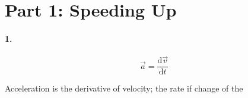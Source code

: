

\usepackage{enumitem}
\usepackage{graphicx}
\graphicspath{ {./lab01images/} }


\renewcommand\assignment{Lab 2: Acceleration and Force, 2/7/2023, Partners: Maite Valentin-Lugo, Seth Waln}



    \iffalse
    \begin{equation*}
        \begin{gathered}
            Equations go here.
        \end{gathered}
    \end{equation*}

    \resizebox{\hsize}{!}{$Long equation goes here$}

    \begin{multicol*}{# of columns}
    \end{multicol*}

    \horizontal

    \fi


    \section*{Part 1: Speeding Up}

    \paragraph*{1.}

    \begin{mdframed}
        \begin{equation}
            \vec{a} = \frac{\mathrm{d}\vec{v}}{\mathrm{d}t}
        \end{equation}

        Acceleration is the derivative of velocity; the rate if change of the 
    \end{mdframed}

